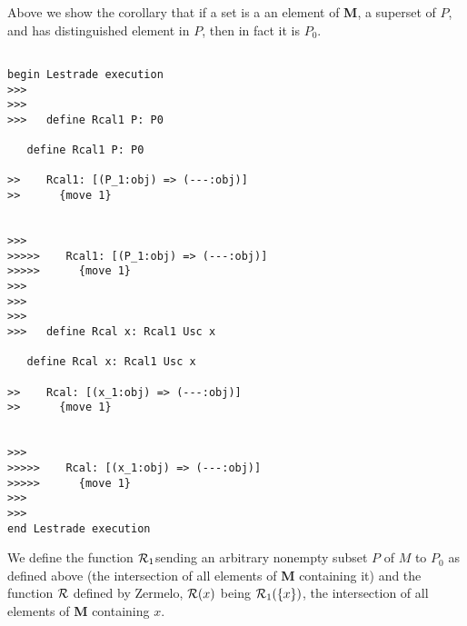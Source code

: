 \documentclass[12pt]{article}
\begin{document}
Above we show the corollary that if a set is a an element of {\bf M}, a superset of $P$, and has distinguished element in $P$, then in fact it is $P_0$.

\begin{verbatim}

begin Lestrade execution
>>>
>>>
>>>   define Rcal1 P: P0

   define Rcal1 P: P0

>>    Rcal1: [(P_1:obj) => (---:obj)]
>>      {move 1}


>>>
>>>>>    Rcal1: [(P_1:obj) => (---:obj)]
>>>>>      {move 1}
>>>
>>>
>>>
>>>   define Rcal x: Rcal1 Usc x

   define Rcal x: Rcal1 Usc x

>>    Rcal: [(x_1:obj) => (---:obj)]
>>      {move 1}


>>>
>>>>>    Rcal: [(x_1:obj) => (---:obj)]
>>>>>      {move 1}
>>>
>>>
end Lestrade execution
\end{verbatim}

We define the function ${\cal R}_1$sending an arbitrary nonempty subset $P$ of $M$ to $P_0$ as defined above (the intersection of all elements of {\bf M} containing it)
and the function $\cal R$ defined by Zermelo, ${\cal R}(x)$ being ${\cal R}_1(\{x\})$, the intersection of all elements of {\bf M} containing $x$.
\end{document}
